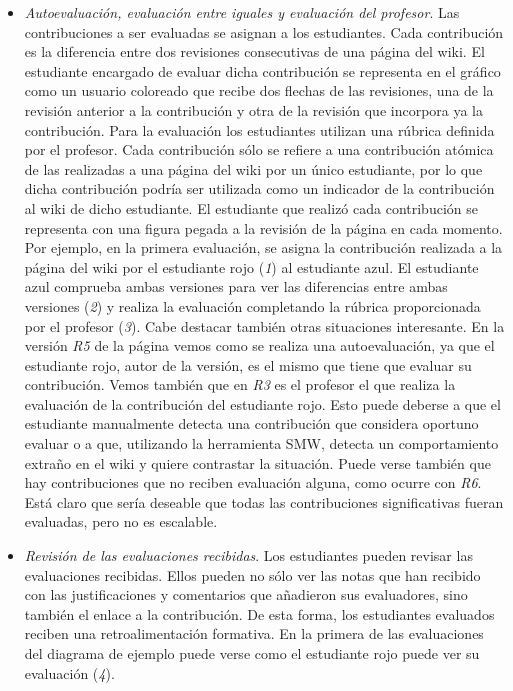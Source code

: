 \begin{itemize}
\item \emph{Autoevaluación, evaluación entre iguales y evaluación del profesor}. Las contribuciones a ser evaluadas se asignan a los estudiantes.  Cada contribución es la diferencia entre dos revisiones consecutivas de una página del wiki. El estudiante encargado de evaluar dicha contribución se representa en el gráfico como un usuario coloreado que recibe dos flechas de las revisiones, una de la revisión anterior a la contribución y otra de la revisión que incorpora ya la contribución. Para la evaluación los estudiantes utilizan una rúbrica definida por el profesor. Cada contribución sólo se refiere a una contribución atómica de las realizadas a una página del wiki por un único estudiante, por lo que dicha contribución podría ser utilizada como un indicador de la contribución al wiki de dicho estudiante. El estudiante que realizó cada contribución se representa con una figura pegada a la revisión de la página en cada momento.
Por ejemplo, en la primera evaluación, se asigna la contribución realizada a la página del wiki por el estudiante rojo (\emph{1}) al estudiante azul. El estudiante azul comprueba ambas versiones para ver las diferencias entre ambas versiones (\emph{2}) y realiza la evaluación completando la rúbrica proporcionada por el profesor (\emph{3}).
Cabe destacar también otras situaciones interesante. En la versión \emph{R5} de la página vemos como se realiza una autoevaluación, ya que el estudiante rojo, autor de la versión, es el mismo que tiene que evaluar su contribución. Vemos también que en \emph{R3} es el profesor el que realiza la evaluación de la contribución del estudiante rojo. Esto puede deberse a que el estudiante manualmente detecta una contribución que considera oportuno evaluar o a que, utilizando la herramienta SMW, detecta un comportamiento extraño en el wiki y quiere contrastar la situación. 
Puede verse también que hay contribuciones que no reciben evaluación alguna, como ocurre con \emph{R6}. Está claro que sería deseable que todas las contribuciones significativas fueran evaluadas, pero no es escalable.
\item \emph{Revisión de las evaluaciones recibidas}. Los estudiantes pueden revisar las evaluaciones recibidas. Ellos pueden no sólo ver las notas que han recibido con las justificaciones y comentarios que añadieron sus evaluadores, sino también el enlace a la contribución. De esta forma, los estudiantes evaluados reciben una retroalimentación formativa. En la primera de las evaluaciones del diagrama de ejemplo puede verse como el estudiante rojo puede ver su evaluación (\emph{4}).

\end{itemize}
